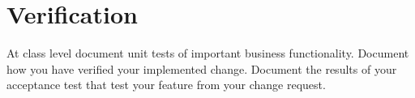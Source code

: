 \section{Verification}
At class level document unit tests of important business functionality.
Document how you have verified your implemented change. 
Document the results of your acceptance test that test your feature from your change request.
